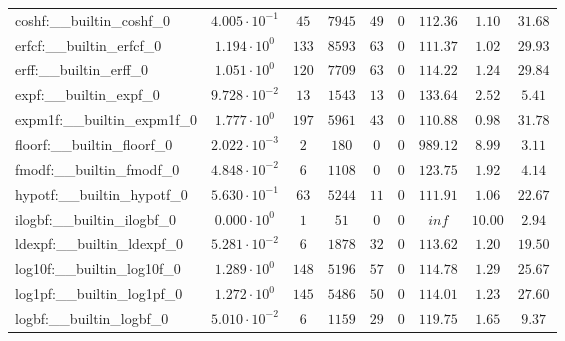 \begin{tabular}{|l|c|c|c|c|c|c|c|c|}
coshf:\_\_builtin\_coshf\_0               & $ 4.005 \cdot 10^{-1} $ & $ 45     $ & $ 7945   $ & $ 49   $ & $ 0   $ & $ 112.36      $ & $ 1.10    $ & $ 31.68   $ \\
erfcf:\_\_builtin\_erfcf\_0               & $ 1.194 \cdot 10^{0}  $ & $ 133    $ & $ 8593   $ & $ 63   $ & $ 0   $ & $ 111.37      $ & $ 1.02    $ & $ 29.93   $ \\
erff:\_\_builtin\_erff\_0                 & $ 1.051 \cdot 10^{0}  $ & $ 120    $ & $ 7709   $ & $ 63   $ & $ 0   $ & $ 114.22      $ & $ 1.24    $ & $ 29.84   $ \\
expf:\_\_builtin\_expf\_0                 & $ 9.728 \cdot 10^{-2} $ & $ 13     $ & $ 1543   $ & $ 13   $ & $ 0   $ & $ 133.64      $ & $ 2.52    $ & $ 5.41    $ \\
expm1f:\_\_builtin\_expm1f\_0             & $ 1.777 \cdot 10^{0}  $ & $ 197    $ & $ 5961   $ & $ 43   $ & $ 0   $ & $ 110.88      $ & $ 0.98    $ & $ 31.78   $ \\
floorf:\_\_builtin\_floorf\_0             & $ 2.022 \cdot 10^{-3} $ & $ 2      $ & $ 180    $ & $ 0    $ & $ 0   $ & $ 989.12      $ & $ 8.99    $ & $ 3.11    $ \\
fmodf:\_\_builtin\_fmodf\_0               & $ 4.848 \cdot 10^{-2} $ & $ 6      $ & $ 1108   $ & $ 0    $ & $ 0   $ & $ 123.75      $ & $ 1.92    $ & $ 4.14    $ \\
hypotf:\_\_builtin\_hypotf\_0             & $ 5.630 \cdot 10^{-1} $ & $ 63     $ & $ 5244   $ & $ 11   $ & $ 0   $ & $ 111.91      $ & $ 1.06    $ & $ 22.67   $ \\
ilogbf:\_\_builtin\_ilogbf\_0             & $ 0.000 \cdot 10^{0}  $ & $ 1      $ & $ 51     $ & $ 0    $ & $ 0   $ & $ inf         $ & $ 10.00   $ & $ 2.94    $ \\
ldexpf:\_\_builtin\_ldexpf\_0             & $ 5.281 \cdot 10^{-2} $ & $ 6      $ & $ 1878   $ & $ 32   $ & $ 0   $ & $ 113.62      $ & $ 1.20    $ & $ 19.50   $ \\
log10f:\_\_builtin\_log10f\_0             & $ 1.289 \cdot 10^{0}  $ & $ 148    $ & $ 5196   $ & $ 57   $ & $ 0   $ & $ 114.78      $ & $ 1.29    $ & $ 25.67   $ \\
log1pf:\_\_builtin\_log1pf\_0             & $ 1.272 \cdot 10^{0}  $ & $ 145    $ & $ 5486   $ & $ 50   $ & $ 0   $ & $ 114.01      $ & $ 1.23    $ & $ 27.60   $ \\
logbf:\_\_builtin\_logbf\_0               & $ 5.010 \cdot 10^{-2} $ & $ 6      $ & $ 1159   $ & $ 29   $ & $ 0   $ & $ 119.75      $ & $ 1.65    $ & $ 9.37    $ \\

\end{tabular}
